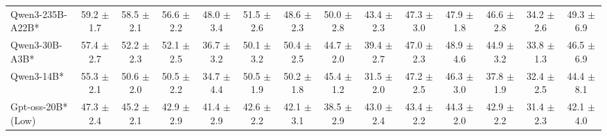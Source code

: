 \documentclass{llmxive}
\begin{document}
\begin{table}[hbt]
{\begin{tabular}{l *{13}{c}}
Qwen3-235B-A22B* &
59.2 {\tiny$\pm$ 1.7} &
58.5 {\tiny$\pm$ 2.1} &
56.6 {\tiny$\pm$ 2.2} &
48.0 {\tiny$\pm$ 3.4} &
51.5 {\tiny$\pm$ 2.6} &
48.6 {\tiny$\pm$ 2.3} &
50.0 {\tiny$\pm$ 2.8} &
43.4 {\tiny$\pm$ 2.3} &
47.3 {\tiny$\pm$ 3.0} &
47.9 {\tiny$\pm$ 1.8} &
46.6 {\tiny$\pm$ 2.8} &
34.2 {\tiny$\pm$ 2.6} &
49.3 {\tiny$\pm$ 6.9} \\
 
\rowcolor{gray!10}
Qwen3-30B-A3B* &
57.4 {\tiny$\pm$ 2.7} &
52.2 {\tiny$\pm$ 2.3} &
52.1 {\tiny$\pm$ 2.5} &
36.7 {\tiny$\pm$ 3.2} &
50.1 {\tiny$\pm$ 3.2} &
50.4 {\tiny$\pm$ 2.5} &
44.7 {\tiny$\pm$ 2.0} &
39.4 {\tiny$\pm$ 2.7} &
47.0 {\tiny$\pm$ 2.3} &
48.9 {\tiny$\pm$ 4.6} &
44.9 {\tiny$\pm$ 3.2} &
33.8 {\tiny$\pm$ 1.3} &
46.5 {\tiny$\pm$ 6.9} \\

 

Qwen3-14B* &
55.3 {\tiny$\pm$ 2.1} &
50.6 {\tiny$\pm$ 2.0} &
50.5 {\tiny$\pm$ 2.2} &
34.7 {\tiny$\pm$ 4.4} &
50.5 {\tiny$\pm$ 1.9} &
50.2 {\tiny$\pm$ 1.8} &
45.4 {\tiny$\pm$ 1.2} &
31.5 {\tiny$\pm$ 2.0} &
47.2 {\tiny$\pm$ 2.5} &
46.3 {\tiny$\pm$ 3.0} &
37.8 {\tiny$\pm$ 1.9} &
32.4 {\tiny$\pm$ 2.5} &
44.4 {\tiny$\pm$ 8.1} \\

\rowcolor{gray!10}
Gpt-oss-20B* (Low)&
47.3 {\tiny$\pm$ 2.4}&	
45.2 {\tiny$\pm$ 2.1}&	
42.9 {\tiny$\pm$ 2.9}&	
41.4 {\tiny$\pm$ 2.9}&	
42.6 {\tiny$\pm$ 2.2}&	
42.1 {\tiny$\pm$ 3.1}&	
38.5 {\tiny$\pm$ 2.9}&
43.0 {\tiny$\pm$ 2.4}&	
43.4 {\tiny$\pm$ 2.2}&	
44.3 {\tiny$\pm$ 2.0}&	
42.9 {\tiny$\pm$ 2.2}&	
31.4 {\tiny$\pm$ 2.3}&	
42.1 {\tiny$\pm$ 4.0}\\	




\end{tabular}}
\end{table}
\end{document}
